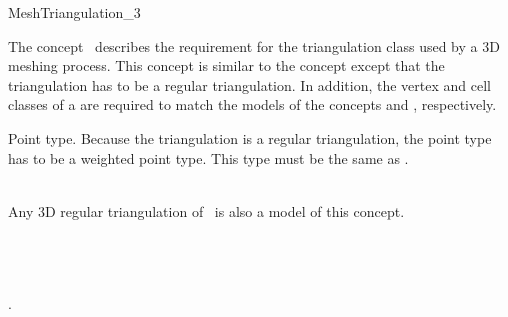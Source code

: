 \ccRefPageBegin


\begin{ccRefConcept}{MeshTriangulation_3}


\ccDefinition
  
The concept \ccRefName\ describes the requirement for the triangulation
class used by a 3D meshing process.
This concept is similar to the concept 
except that the triangulation has to be a regular triangulation.
In addition, the vertex and cell classes of 
a 
are required to match the
models of the concepts  and
, respectively.



\ccTypes

{Point type. Because the triangulation is a regular
triangulation, the point type has to be a weighted point type.
This type must be the same as .}




\ccHasModels
{} \\
Any 3D regular triangulation of \cgal\ is also a model of this concept.



\ccSeeAlso
{}\\
 \\
 \\
.


\end{ccRefConcept}

\ccRefPageEnd

